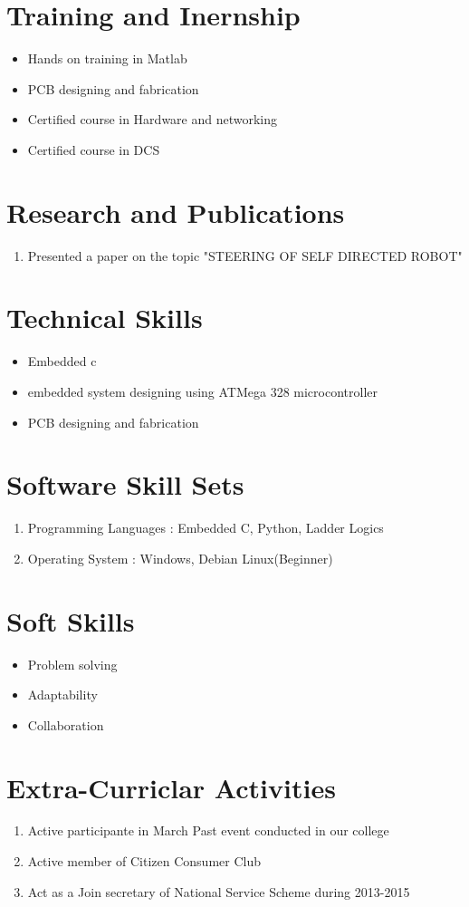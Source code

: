 \documentclass{My_CV_Class}
\begin{document}
\section{Training and Inernship}
\begin{itemize}
	\item Hands on training in Matlab
	\item PCB designing and fabrication
	\item Certified course in Hardware and networking
	\item Certified course in DCS
\end{itemize}
\section{Research and Publications}
\begin{enumerate}
	\item Presented a paper on the topic "STEERING OF SELF DIRECTED ROBOT"
\end{enumerate}
\section{Technical Skills}
\begin{itemize}
	\item Embedded c 
	\item embedded system designing using ATMega 328 microcontroller
	\item PCB designing and fabrication 
\end{itemize}
\newpage
\section{Software Skill Sets}
\begin{enumerate}
	\item Programming Languages : Embedded C, Python, Ladder Logics
	\item Operating System      : Windows, Debian Linux(Beginner)
\end{enumerate}
\section{Soft Skills}
\begin{itemize}
	\item Problem solving
	\item Adaptability
	\item Collaboration
\end{itemize}
\section{Extra-Curriclar Activities}
\begin{enumerate}
	\item Active participante in March Past event conducted in our college
	\item Active member of Citizen Consumer Club
	\item Act as a Join secretary of National Service Scheme during 2013-2015
\end{enumerate}
\end{document}

